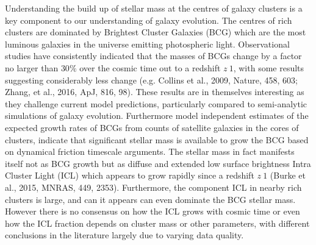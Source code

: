 \documentclass[a4paper,11pt]{article}
\begin{document}
Understanding the build up of stellar mass at the centres of galaxy
clusters is a key component to our understanding of galaxy
evolution. The centres of rich clusters are dominated by Brightest
Cluster Galaxies (BCG) which are the most luminous galaxies in the
universe emitting photospheric light. Observational studies have
consistently indicated that the masses of BCGs change by a factor no
larger than $30\%$ over the cosmic time out to a redshift $ z~1$, with
some results suggesting considerably less change (e.g. Collins et al.,
2009, Nature, 458, 603; Zhang, et al., 2016, ApJ, 816, 98). These
results are in themselves interesting as they challenge current model
predictions, particularly compared to semi-analytic simulations of
galaxy evolution. Furthermore model independent estimates of the
expected growth rates of BCGs from counts of satellite galaxies in the
cores of clusters, indicate that significant stellar mass is available
to grow the BCG based on dynamical friction timescale arguments. The
stellar mass in fact manifests itself not as BCG growth but as diffuse
and extended low surface brightness Intra Cluster Light (ICL) which
appears to grow rapidly since a redshift $z~1$ (Burke et al., 2015,
MNRAS, 449, 2353). Furthermore, the component ICL in nearby rich
clusters is large, and can it appears can even dominate the BCG
stellar mass. However there is no consensus on how the ICL grows with
cosmic time or even how the ICL fraction depends on cluster mass or
other parameters, with different conclusions in the literature largely
due to varying data quality.
\end{document}
